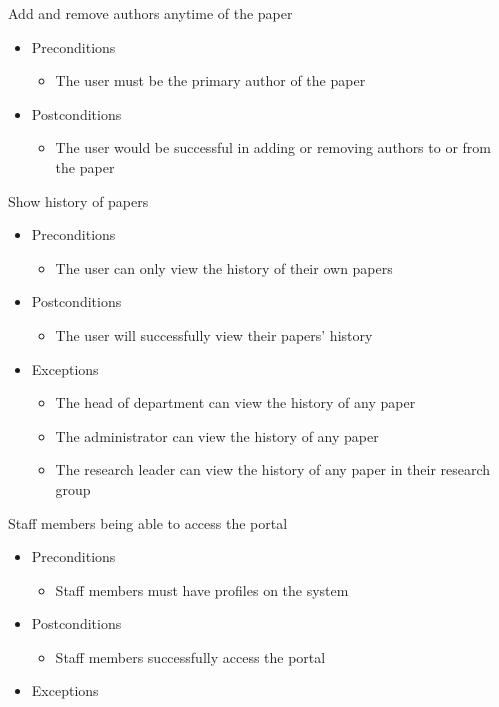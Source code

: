 \documentclass[a4paper,12pt]{article}
\begin{document}
Add and remove authors anytime of the paper
\begin{itemize}
    \item Preconditions
    \begin{itemize}
        \item The user must be the primary author of the paper
    \end{itemize}
    \item Postconditions
    \begin{itemize}
        \item The user would be successful in adding or removing authors to or from the paper
    \end{itemize}
\end{itemize}
Show history of papers
\begin{itemize}
    \item Preconditions
    \begin{itemize}
        \item The user can only view the history of their own papers
    \end{itemize}
    \item Postconditions
    \begin{itemize}
        \item The user will successfully view their papers' history
    \end{itemize}
    \item Exceptions
    \begin{itemize}
        \item The head of department can view the history of any paper
        \item The administrator can view the history of any paper
        \item The research leader can view the history of any paper in their research group
    \end{itemize}
\end{itemize}
Staff members being able to access the portal
\begin{itemize}
    \item Preconditions
    \begin{itemize}
        \item Staff members must have profiles on the system
    \end{itemize}
    \item Postconditions
    \begin{itemize}
        \item Staff members successfully access the portal
    \end{itemize}
    \item Exceptions
\end{itemize}
\end{document}
